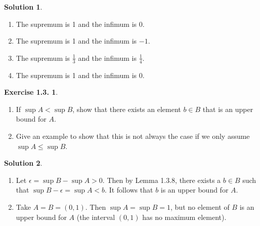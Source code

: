 \documentclass[12pt]{article}
\theoremstyle{definition}
\theoremstyle{exercise}
\newtheorem{exercise}{Exercise 1.3.}
\theoremstyle{solution}
\newtheorem*{solution}{Solution}
\begin{document}
\begin{solution}
    \begin{enumerate}
        \item The supremum is 1 and the infimum is 0.

        \item The supremum is 1 and the infimum is \( -1 \).

        \item The supremum is \( \tfrac{1}{3} \) and the infimum is \( \tfrac{1}{4} \).

        \item The supremum is 1 and the infimum is 0.
    \end{enumerate}
\end{solution}

\begin{exercise}
\label{ex:9}
    \begin{enumerate}
        \item If \( \sup A < \sup B \), show that there exists an element \( b \in B \) that is an upper bound for \( A \).

        \item Give an example to show that this is not always the case if we only assume \( \sup A \leq \sup B \).
    \end{enumerate}
\end{exercise}

\begin{solution}
    \begin{enumerate}
        \item Let \( \epsilon = \sup B - \sup A > 0 \). Then by Lemma 1.3.8, there exists a \( b \in B \) such that \( \sup B - \epsilon = \sup A < b \). It follows that \( b \) is an upper bound for \( A \).

        \item Take \( A = B = (0, 1) \). Then \( \sup A = \sup B = 1 \), but no element of \( B \) is an upper bound for \( A \) (the interval \( (0, 1) \) has no maximum element).
    \end{enumerate}
\end{solution}
\end{document}
